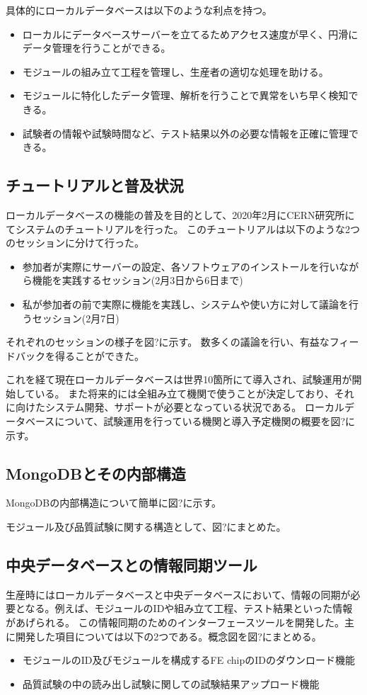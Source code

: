 具体的にローカルデータベースは以下のような利点を持つ。

\begin{itemize}
  \item ローカルにデータベースサーバーを立てるためアクセス速度が早く、円滑にデータ管理を行うことができる。
  \item モジュールの組み立て工程を管理し、生産者の適切な処理を助ける。
  \item モジュールに特化したデータ管理、解析を行うことで異常をいち早く検知できる。
  \item 試験者の情報や試験時間など、テスト結果以外の必要な情報を正確に管理できる。
\end{itemize}

\subsection{チュートリアルと普及状況}
ローカルデータベースの機能の普及を目的として、2020年2月にCERN研究所にてシステムのチュートリアルを行った。
このチュートリアルは以下のような2つのセッションに分けて行った。

\begin{itemize}
  \item 参加者が実際にサーバーの設定、各ソフトウェアのインストールを行いながら機能を実践するセッション(2月3日から6日まで)
  \item 私が参加者の前で実際に機能を実践し、システムや使い方に対して議論を行うセッション(2月7日)
\end{itemize}

それぞれのセッションの様子を図?に示す。
数多くの議論を行い、有益なフィードバックを得ることができた。

これを経て現在ローカルデータベースは世界10箇所にて導入され、試験運用が開始している。
また将来的には全組み立て機関で使うことが決定しており、それに向けたシステム開発、サポートが必要となっている状況である。
ローカルデータベースについて、試験運用を行っている機関と導入予定機関の概要を図?に示す。

\subsection{MongoDBとその内部構造}
MongoDBの内部構造について簡単に図?に示す。

モジュール及び品質試験に関する構造として、図?にまとめた。

\subsection{中央データベースとの情報同期ツール}
生産時にはローカルデータベースと中央データベースにおいて、情報の同期が必要となる。例えば、モジュールのIDや組み立て工程、テスト結果といった情報があげられる。
この情報同期のためのインターフェースツールを開発した。主に開発した項目については以下の2つである。概念図を図?にまとめる。
\begin{itemize}
  \item モジュールのID及びモジュールを構成するFE chipのIDのダウンロード機能
  \item 品質試験の中の読み出し試験に関しての試験結果アップロード機能
\end{itemize}

